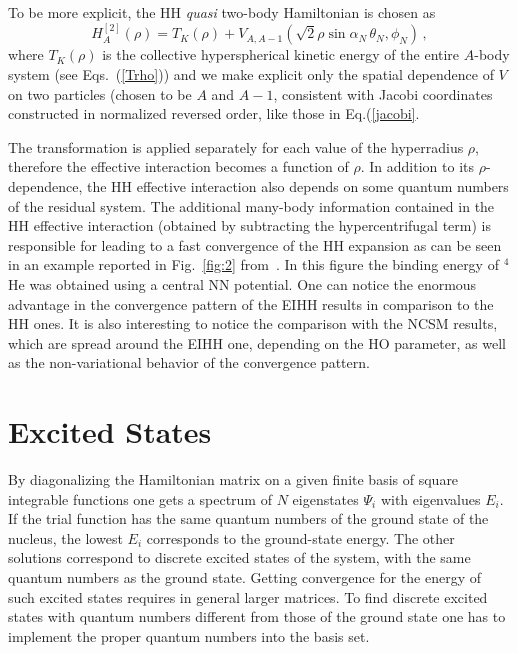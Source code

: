 To be more explicit, the HH {\it quasi} two-body Hamiltonian is chosen as  
\begin{equation}
\label{H_quasi}
 H^{[2]}_A(\rho)= T_K(\rho) + V_{A,A-1}(\sqrt{2}\rho \sin{\alpha_N} \, \theta_N,\phi_N)\,,
\end{equation} 
where $T_K(\rho)$ is the collective hyperspherical kinetic energy of the entire $A$-body system 
(see Eqs.~(\ref{Trho})) and we make explicit only the spatial dependence of $V$ on two particles 
(chosen to be $A$ and $A-1$, consistent with  Jacobi coordinates constructed  in normalized reversed order, like those
in Eq.(\ref{jacobi}. 

The  transformation is applied separately for each value of the hyperradius $\rho$,
therefore the effective interaction becomes a function of $\rho$.
In addition to its $\rho$-dependence, the HH effective interaction
also depends on some quantum numbers of the
residual system. The  additional many-body information contained in the HH effective interaction 
(obtained by subtracting the hypercentrifugal term) is responsible for 
leading to a fast convergence of the HH expansion as can be seen in an example reported in Fig.~\ref{fig:2} from~\cite{BaL00}.
In this figure the binding energy of $^4$He was obtained using a central NN potential. One can notice the enormous advantage 
in the convergence pattern of the EIHH results in comparison to the HH ones. It is also interesting to notice the comparison with the NCSM 
results, which are spread around the EIHH one, depending on the HO parameter, as well as the non-variational behavior 
of the convergence pattern.


\section{Excited States}\label{sec:EXCITED}
By diagonalizing the Hamiltonian matrix on a given finite basis of square integrable functions one gets a spectrum of $N$
eigenstates $\Psi_i$ with eigenvalues $E_i$. If the trial function has the same quantum numbers of the ground state
of the nucleus,  the lowest $E_i$ corresponds to the ground-state energy. The other solutions correspond to discrete excited 
states of the system, 
with the same quantum numbers as the ground state. Getting convergence for the energy of such excited states requires 
in general larger matrices. 
To find discrete excited states with quantum numbers different from those of the ground state one has to implement 
the proper quantum numbers into the basis set.

